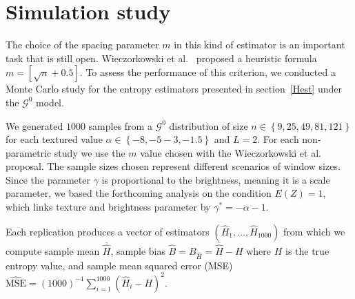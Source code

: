 \documentclass[journal]{IEEEtran}
\begin{document}
\section{Simulation study}\label{sec:simulation}

The choice of the spacing parameter $m$ in this kind of estimator is an important task that is still open. Wieczorkowski et al.~\cite{Wieczorkowski1999} proposed a heuristic formula $m=[\sqrt{n}+0.5]$. To assess the performance of this criterion, we conducted a Monte Carlo study for the entropy estimators presented in section~\ref{Hest} under the $\mathcal{G}^0$ model.

We generated $1000$ samples from a $\mathcal{G}^0$ distribution of size $n \in\left\lbrace 9,25,49,81,121\right\rbrace $ for each textured value $\alpha \in\left\lbrace -8,-5-3,-1.5\right\rbrace $ and $L=2$. For each non-parametric study we use the $m$ value chosen with the Wieczorkowski et al. proposal.
The sample sizes chosen represent different scenarios of window sizes. Since the parameter $\gamma$ is proportional to the brightness, meaning it is a scale parameter, we based the forthcoming analysis on the condition $E(Z)=1$, which links texture and brightness parameter by $\gamma^* =-\alpha-1$. 

Each replication produces a vector  of estimators $(\widehat{H}_1, \dots, \widehat{H}_{1000})$ from which we compute sample mean $\overline{\widehat{H}}$, 
sample bias $\widehat{B}=B_{\widehat{H}} = \overline{\widehat{H}}- H$ where $H$ is the true entropy value, and sample mean squared error (MSE) $\widehat{\textrm{MSE}}=({1000})^{-1}{\sum_{i=1}^{1000}{(\widehat{H}_i-H)^2}}$.
\end{document}
